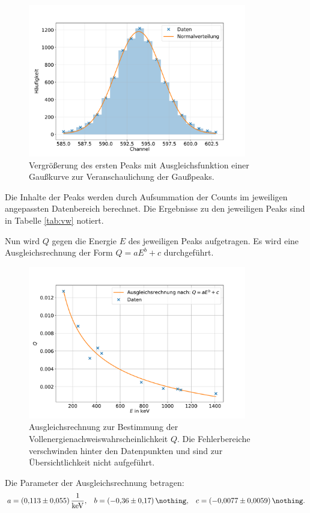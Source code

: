 \begin{figure}[h!]
  \centering
  \includegraphics[width=0.85\textwidth]{content/images/europium_peak_0.pdf}
  \caption{Vergrößerung des ersten Peaks mit Ausgleichsfunktion einer Gaußkurve zur Veranschaulichung der Gaußpeaks.}
  \label{fig:europium_peak_0}
\end{figure}
Die Inhalte der Peaks werden durch Aufsummation der Counts im jeweiligen angepassten Datenbereich berechnet.
Die Ergebnisse zu den jeweiligen Peaks sind in Tabelle \ref{tab:vw} notiert.

Nun wird $Q$ gegen die Energie $E$ des jeweiligen Peaks aufgetragen.
Es wird eine Ausgleichsrechnung der Form $Q=a E^{b} + c$ durchgeführt.
\begin{figure}[h!]
  \centering
  \includegraphics[width=0.85\textwidth]{content/images/vollenergienachweiswahrscheinlichkeit.pdf}
  \caption{Ausgleichsrechnung zur Bestimmung der Vollenergienachweiswahrscheinlichkeit $Q$.
  Die Fehlerbereiche verschwinden hinter den Datenpunkten und sind zur Übersichtlichkeit nicht aufgeführt.}
  \label{fig:vw}
\end{figure}
Die Parameter der Ausgleichsrechnung betragen:
\begin{align*}
	a = \SI{0.113 (55)}{\frac{1}{\kilo \electronvolt}}, && b = \SI{-0.36 (17)}{\nothing}, && c = \SI{-0.0077 (59)}{\nothing}.
\end{align*}
\FloatBarrier

